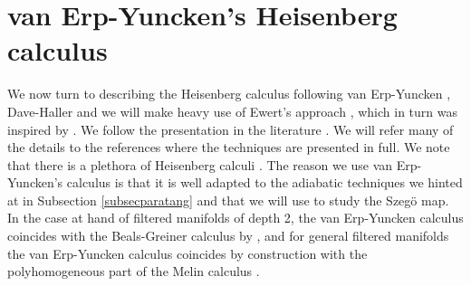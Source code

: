 \documentclass[a4paper,reqno]{amsart}
\numberwithin{equation}{section}
\theoremstyle{definition}
\theoremstyle{remark}
\begin{document}
\section{van Erp-Yuncken's Heisenberg calculus}
\label{subsecparatangb}

We now turn to describing the Heisenberg calculus following van Erp-Yuncken \cite{vanerpyunck}, Dave-Haller \cite{Dave_Haller1} and we will make heavy use of Ewert's approach \cite{ewertthesis, ewertfixed}, which in turn was inspired by \cite{debordskandav}. We follow the presentation in the literature \cite{Dave_Haller1,ewertfixed,goffkuz,goffbgg,vanerpyunck}. We will refer many of the details to the references where the techniques are presented in full. We note that there is a plethora of Heisenberg calculi \cite{andromoyu,bealsgreiner,christgelleretal,fischruzh,melinoldpreprint,pongemonograph,streetbook, taylorncom}. The reason we use van Erp-Yuncken's calculus is that it is well adapted to the adiabatic techniques we hinted at in Subsection \ref{subsecparatang} and that we will use to study the Szegö map. In the case at hand of filtered manifolds of depth 2, the van Erp-Yuncken calculus coincides with the Beals-Greiner calculus \cite{bealsgreiner} by \cite{yunckencouchet}, and for general filtered manifolds the van Erp-Yuncken calculus coincides by construction with the polyhomogeneous part of the Melin calculus \cite{melinoldpreprint}. 
\end{document}
